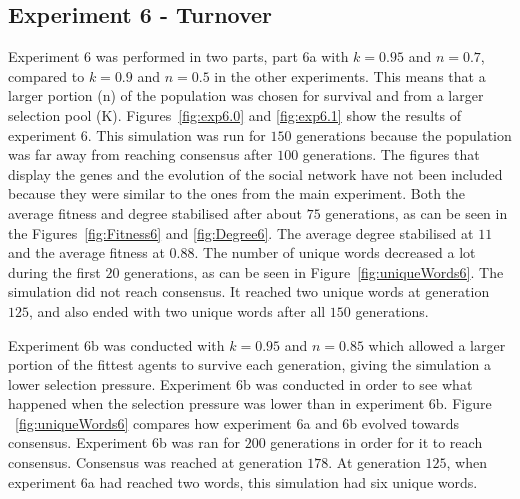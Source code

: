 \clearpage
\subsection{Experiment 6 - Turnover}
%
Experiment 6 was performed in two parts, part 6a with $k = 0.95$ and $n = 0.7$, compared to $k = 0.9$ and $n = 0.5$ in the other experiments. This means that a larger portion (n) of the population was chosen for survival and from a larger selection pool (K). Figures~\ref{fig:exp6.0} and \ref{fig:exp6.1} show the results of experiment 6. This simulation was run for $150$ generations because the population was far away from reaching consensus after $100$ generations. The figures that display the genes and the evolution of the social network have not been included because they were similar to the ones from the main experiment. Both the average fitness and degree stabilised after about $75$ generations, as can be seen in the Figures~\ref{fig:Fitness6} and \ref{fig:Degree6}. The average degree stabilised at $11$ and the average fitness at $0.88$. The number of unique words decreased a lot during the first $20$ generations, as can be seen in Figure~\ref{fig:uniqueWords6}. The simulation did not reach consensus. It reached two unique words at generation $125$, and also ended with two unique words after all $150$ generations.   

Experiment 6b was conducted with $k = 0.95$ and $n = 0.85$ which allowed a larger portion of the fittest agents to survive each generation, giving the simulation a lower selection pressure. Experiment 6b was conducted in order to see what happened when the selection pressure was lower than in experiment 6b. Figure ~\ref{fig:uniqueWords6} compares how experiment 6a and 6b evolved towards consensus. Experiment 6b was ran for $200$ generations in order for it to reach consensus. Consensus was reached at generation $178$. At generation $125$, when experiment 6a had reached two words, this simulation had six unique words. 

